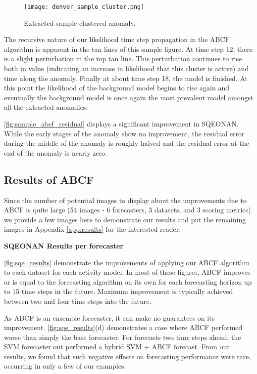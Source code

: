 \begin{wrapfigure}{R}{0.3\textwidth}
\centering
\texttt{[image: denver\_sample\_cluster.png]}
\caption{Extracted sample clustered anomaly.}
\label{fig:sample_cluster}
\end{wrapfigure}

The recursive nature of our likelihood time step propagation in the ABCF algorithm is apparent in the tan lines of this sample figure.  At time step 12, there is a slight perturbation in the top tan line.  This perturbation continues to rise both in value (indicating an increase in likelihood that this cluster is active) and time along the anomaly.  Finally at about time step 18, the model is finished.  At this point the likelihood of the background model begins to rise again and eventually the background model is once again the most prevalent model amongst all the extracted anomalies.

\ref{fig:sample_abcf_residual} displays a significant improvement in SQEONAN.  While the early stages of the anomaly show no improvement, the residual error during the middle of the anomaly is roughly halved and the residual error at the end of the anomaly is nearly zero.



\subsection{Results of ABCF}
Since the number of potential images to display about the improvements due to ABCF is quite large (54 images - 6 forecasters, 3 datasets, and 3 scoring metrics) we provide a few images here to demonstrate our results and put the remaining images in Appendix \ref{app:results} for the interested reader.

\bigskip
\noindent \textbf{SQEONAN Results per forecaster} 

\ref{fig:sqe_results} demonstrate the improvements of applying our ABCF algorithm to each dataset for each activity model.  In most of these figures, ABCF improves or is equal to the forecasting algorithm on its own for each forecasting horizon up to 15 time steps in the future.  Maximum improvement is typically achieved between two and four time steps into the future.  

As ABCF is an ensemble forecaster, it can make no guarantees on its improvement.  \ref{fig:sqe_results}(d) demonstrates a case where ABCF performed worse than simply the base forecaster.  For forecasts two time steps ahead, the SVM forecaster out performed a hybrid SVM + ABCF forecast.  From our results, we found that such negative effects on forecasting performance were rare, occurring in only a few of our examples.

